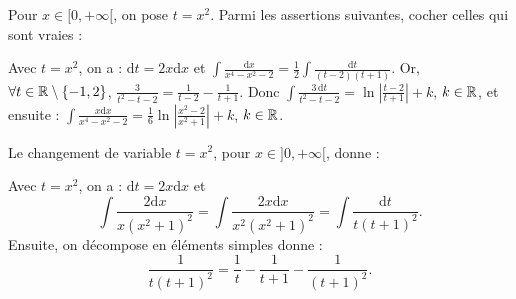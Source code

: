 \begin{question}
Pour $x\in [0,+\infty[$, on pose $t=x^2$. Parmi les assertions suivantes, cocher celles qui sont vraies :
\begin{answers}  
\end{answers}
\vskip2mm
\begin{explanations}
Avec $t= x^2$, on a : $\mathrm{d}t=2x\mathrm{d}x$ et 
$\displaystyle \int \frac{\mathrm{d}x}{x^4-x^2-2}=\frac{1}{2}\int \frac{\mathrm{d}t}{(t-2)(t+1)}$. Or, $\forall t\in \mathbb{R}\setminus \{-1,2\}$, $\displaystyle \frac{3}{t^2-t-2}=\frac{1}{t-2}-\frac{1}{t+1}$. Donc $\displaystyle \int \frac{3\, \mathrm{d}t}{t^2-t-2}=\ln\left|\frac{t-2}{t+1}\right|+k$, $k\in \mathbb{R}$, et ensuite : 
$\displaystyle \int \frac{x\mathrm{d}x}{x^4-x^2-2}=\frac{1}{6}\ln\left|\frac{x^2-2}{x^2+1}\right|+k$, $k\in \mathbb{R}$.
\end{explanations}
\end{question}

\begin{question}
Le changement de variable $t=x^2$, pour $x\in ]0,+\infty[$, donne :
\begin{answers}  
\end{answers}
\vskip2mm
\begin{explanations}
Avec $t= x^2$, on a : $\mathrm{d}t=2x\mathrm{d}x$ et 
$$\int \frac{2\mathrm{d}x}{x(x^2+1)^2}=\int \frac{2x\mathrm{d}x}{x^2(x^2+1)^2}=\int \frac{\mathrm{d}t}{t(t+1)^2}.$$
Ensuite, on décompose en éléments simples donne :
$$\frac{1}{t(t+1)^2}=\frac{1}{t}-\frac{1}{t+1}-\frac{1}{(t+1)^2}.$$
\end{explanations}
\end{question}

